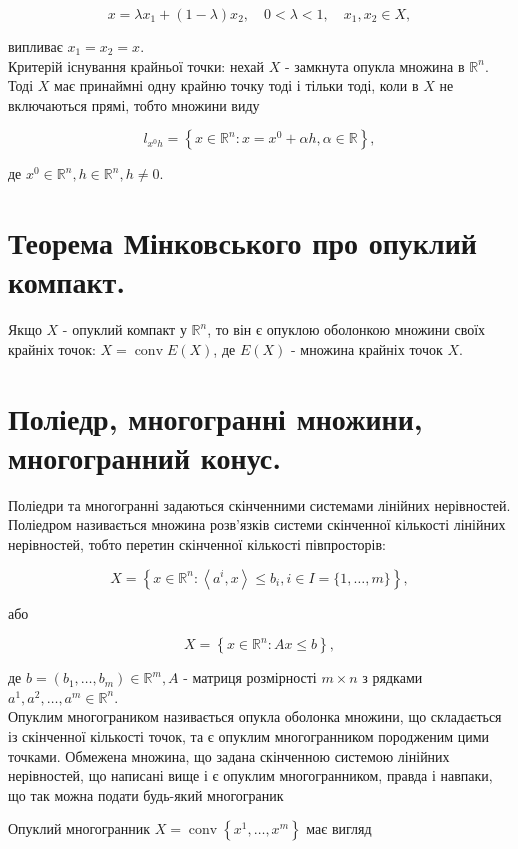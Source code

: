 \documentclass[10pt]{article}
\begin{document}
$$
x=\lambda x_{1}+(1-\lambda) x_{2}, \quad 0<\lambda<1, \quad x_{1}, x_{2} \in X,
$$

випливає $x_{1}=x_{2}=x$.\\
Критерій існування крайньої точки: нехай $X$ - замкнута опукла множина в $\mathbb{R}^{n}$. Тоді $X$ має принаймні одну крайню точку тоді і тільки тоді, коли в $X$ не включаються прямі, тобто множини виду

$$
l_{x^{0} h}=\left\{x \in \mathbb{R}^{n}: x=x^{0}+\alpha h, \alpha \in \mathbb{R}\right\},
$$

де $x^{0} \in \mathbb{R}^{n}, h \in \mathbb{R}^{n}, h \neq 0$.

\section*{Теорема Мінковського про опуклий компакт.}
Якщо $X$ - опуклий компакт у $\mathbb{R}^{n}$, то він є опуклою оболонкою множини своїх крайніх точок: $X=\operatorname{conv} E(X)$, де $E(X)$ - множина крайніх точок $X$.

\section*{Поліедр, многогранні множини, многогранний конус.}
Поліедри та многогранні задаються скінченними системами лінійних нерівностей.\\
Поліедром називається множина розв'язків системи скінченної кількості лінійних нерівностей, тобто перетин скінченної кількості півпросторів:

$$
X=\left\{x \in \mathbb{R}^{n}:\left\langle a^{i}, x\right\rangle \leq b_{i}, i \in I=\{1, \ldots, m\}\right\},
$$

або

$$
X=\left\{x \in \mathbb{R}^{n}: A x \leq b\right\},
$$

де $b=\left(b_{1}, \ldots, b_{m}\right) \in \mathbb{R}^{m}, A$ - матриця розмірності $m \times n$ з рядками $a^{1}, a^{2}, \ldots, a^{m} \in \mathbb{R}^{n}$.\\
Опуклим многограником називається опукла оболонка множини, що складається із скінченної кількості точок, та є опуклим многогранником породженим цими точками. Обмежена множина, що задана скінченною системою лінійних нерівностей, що написані вище і є опуклим многогранником, правда і навпаки, що так можна подати будь-який многограник

Опуклий многогранник $X=\operatorname{conv}\left\{x^{1}, \ldots, x^{m}\right\}$ має вигляд
\end{document}
